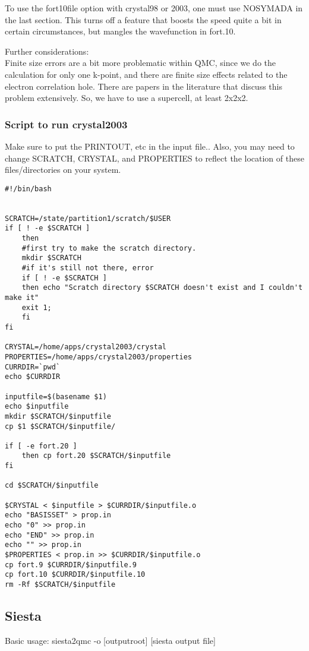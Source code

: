 \documentclass[12pt]{article}
\begin{document}
To use the fort10file option with crystal98 or 2003, one must use NOSYMADA in
the last section.  This turns off a feature that boosts the speed quite a bit in certain circumstances, but
mangles the wavefunction in fort.10.  

Further considerations:\\
Finite size errors are a bit more problematic within QMC, since we do the calculation for only one
k-point, and there are finite size effects related to the electron correlation hole.  There are papers in the literature that discuss this problem extensively.
So, we have to use a supercell, at least  2x2x2.



\subsubsection{Script to run crystal2003}

Make sure to put the PRINTOUT, etc in the input file..  Also, you may need to change SCRATCH, CRYSTAL, and 
PROPERTIES to reflect the location of these files/directories on your system.
\begin{verbatim}
#!/bin/bash


SCRATCH=/state/partition1/scratch/$USER
if [ ! -e $SCRATCH ]
    then
    #first try to make the scratch directory.
    mkdir $SCRATCH
    #if it's still not there, error
    if [ ! -e $SCRATCH ]
    then echo "Scratch directory $SCRATCH doesn't exist and I couldn't make it"
    exit 1;
    fi
fi

CRYSTAL=/home/apps/crystal2003/crystal
PROPERTIES=/home/apps/crystal2003/properties
CURRDIR=`pwd`
echo $CURRDIR

inputfile=$(basename $1)
echo $inputfile
mkdir $SCRATCH/$inputfile
cp $1 $SCRATCH/$inputfile/

if [ -e fort.20 ]
    then cp fort.20 $SCRATCH/$inputfile
fi

cd $SCRATCH/$inputfile

$CRYSTAL < $inputfile > $CURRDIR/$inputfile.o
echo "BASISSET" > prop.in
echo "0" >> prop.in
echo "END" >> prop.in
echo "" >> prop.in
$PROPERTIES < prop.in >> $CURRDIR/$inputfile.o
cp fort.9 $CURRDIR/$inputfile.9
cp fort.10 $CURRDIR/$inputfile.10
rm -Rf $SCRATCH/$inputfile
\end{verbatim}

\subsection{Siesta}
Basic usage: siesta2qmc -o [outputroot]  [siesta output file] 
\end{document}
